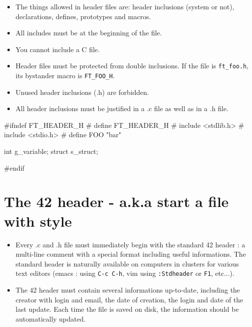 \documentclass{42-ru}
\begin{document}
        \begin{itemize}

            \item The things allowed in header files are:
                header inclusions (system or not), declarations, defines,
                prototypes and macros.

            \item All includes must be at the beginning of the file.

            \item You cannot include a C file.

            \item Header files must be protected from double inclusions. If the file is
            \texttt{ft\_foo.h}, its bystander macro is \texttt{FT\_FOO\_H}.

            \item Unused header inclusions (.h) are forbidden.

            \item All header inclusions must be justified in a .c file
                as well as in a .h file.

        \end{itemize}

        \begin{42ccode}
#ifndef FT_HEADER_H
# define FT_HEADER_H
# include <stdlib.h>
# include <stdio.h>
# define FOO "bar"

int		g_variable;
struct	s_struct;

#endif
        \end{42ccode}
        \newpage



   \section{The 42 header - a.k.a start a file with style}

        \begin{itemize}

        \item Every .c and .h file must immediately begin with the standard 42 header :
          a multi-line comment with a special format including useful informations. The
          standard header is naturally available on computers in clusters for various
          text editors (emacs : using \texttt{C-c C-h}, vim using \texttt{:Stdheader} or
          \texttt{F1}, etc...).

        \item The 42 header must contain several informations up-to-date, including the
          creator with login and email, the date of creation, the login and date of the
          last update. Each time the file is saved on disk, the information should be
          automatically updated.

        \end{itemize}
        \newpage
        
\end{document}
